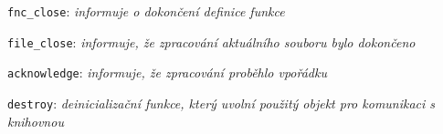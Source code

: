 \begin{myitemize}[itemsep=0pt,partopsep=0pt,parsep=0pt,topsep=0pt,label=\textbullet]
\begin{myitemize}[itemsep=0pt,partopsep=0pt,parsep=0pt,topsep=0pt,label=\textbullet]
\begin{myitemize}
\begin{myitemize}[itemsep=0pt,partopsep=0pt,parsep=0pt,topsep=0pt,label=\textbullet]
\begin{myitemize}[itemsep=0pt,partopsep=0pt,parsep=0pt,topsep=0pt,label=\textbullet]
\begin{myitemize}[itemsep=0pt,partopsep=0pt,parsep=0pt,topsep=0pt,label=\textbullet]
                    \end{myitemize}
                \end{myitemize}
              \item \texttt{fnc\_close}: \textit{informuje o dokončení definice funkce}
            \end{myitemize}
        \end{myitemize}
      \item \texttt{file\_close}: \textit{informuje, že zpracování aktuálního souboru bylo dokončeno}
    \end{myitemize}
  \item \texttt{acknowledge}: \textit{informuje, že zpracování proběhlo vpořádku}
  \item \texttt{destroy}: \textit{deinicializační funkce, který uvolní použitý objekt pro komunikaci s knihovnou}
\end{myitemize}

